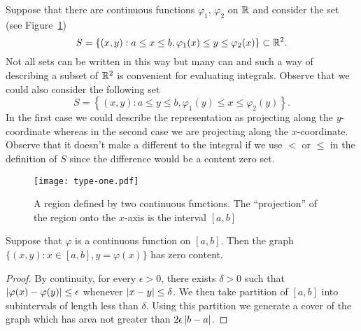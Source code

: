 Suppose that there are continuous functions \(\varphi_1\), \(\varphi_2\) on \(\mathbb{R}\) and consider the set (see Figure~\ref{fig:type-one})
\[
    S = \left\{(x,y): a \leq x \leq b, \varphi_1(x) \leq y \leq \varphi_2(x)\right\} \subset \mathbb{R}^2.
\]
Not all sets can be written in this way but many can and such a way of describing a subset of \(\mathbb{R}^2\) is convenient for evaluating integrals.
Observe that we could also consider the following set
\[
    S = \left\{(x,y): a \leq y \leq b, \varphi_1(y) \leq x \leq \varphi_2(y)\right\}.
\]
In the first case we could describe the representation as projecting along the \(y\)-coordinate whereas in the second case we are projecting along the \(x\)-coordinate.
Observe that it doesn't make a different to the integral if we use \(<\) or \(\leq\) in the definition of \(S\) since the difference would be a content zero set.
%
%
\begin{figure}
    \centering
    \texttt{[image: type-one.pdf]}
    \caption{A region defined by two continuous functions. The ``projection'' of the region onto the \(x\)-axis is the interval \([a,b]\)}%
    \label{fig:type-one}
\end{figure}
%
\begin{theorem*}
    Suppose that \(\varphi\) is a continuous function on \([a,b]\).
    Then the graph
    \(\big\{(x,y): x\in [a,b], y=\varphi(x)\big\}\)
    has zero content.
\end{theorem*}
%
\begin{proof}
    By continuity, for every \(\epsilon>0\), there exists \(\delta>0\) such that \(\left|\varphi(x) - \varphi(y)\right|\leq \epsilon\) whenever \(\left|x-y\right|\leq \delta\).
    We then take partition of \([a,b]\) into subintervals of length less than \(\delta\).
    Using this partition we generate a cover of the graph which has area not greater than \(2\epsilon \left|b-a\right|\).
\end{proof}

